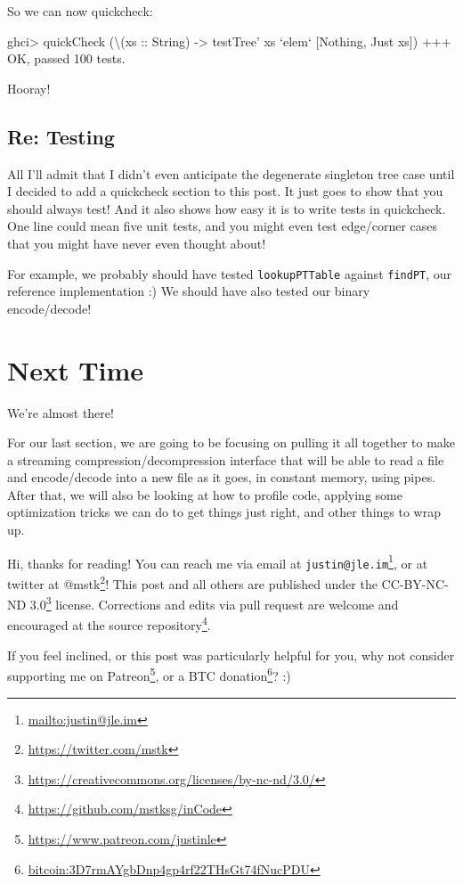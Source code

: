 \documentclass[]{article}
\newenvironment{Shaded}{}{}
\newcommand{\DataTypeTok}[1]{\textcolor[rgb]{0.56,0.13,0.00}{#1}}
\newcommand{\DecValTok}[1]{\textcolor[rgb]{0.25,0.63,0.44}{#1}}
\newcommand{\FunctionTok}[1]{\textcolor[rgb]{0.02,0.16,0.49}{#1}}
\newcommand{\NormalTok}[1]{#1}
\newcommand{\OtherTok}[1]{\textcolor[rgb]{0.00,0.44,0.13}{#1}}
\renewcommand{\href}[2]{#2\footnote{\url{#1}}}
\begin{document}
So we can now quickcheck:

\begin{Shaded}
\begin{Highlighting}[]
\NormalTok{ghci}\FunctionTok{>}\NormalTok{ quickCheck (\textbackslash{}(}\OtherTok{xs ::} \DataTypeTok{String}\NormalTok{) }\OtherTok{->}\NormalTok{ testTree' xs }\OtherTok{`elem`}\NormalTok{ [}\DataTypeTok{Nothing}\NormalTok{, }\DataTypeTok{Just}\NormalTok{ xs])}
\FunctionTok{+++} \DataTypeTok{OK}\NormalTok{, passed }\DecValTok{100}\NormalTok{ tests}\FunctionTok{.}
\end{Highlighting}
\end{Shaded}

Hooray!

\hypertarget{re-testing}{%
\subsection{Re: Testing}\label{re-testing}}

All I'll admit that I didn't even anticipate the degenerate singleton tree case
until I decided to add a quickcheck section to this post. It just goes to show
that you should always test! And it also shows how easy it is to write tests in
quickcheck. One line could mean five unit tests, and you might even test
edge/corner cases that you might have never even thought about!

For example, we probably should have tested \texttt{lookupPTTable} against
\texttt{findPT}, our reference implementation :) We should have also tested our
binary encode/decode!

\hypertarget{next-time}{%
\section{Next Time}\label{next-time}}

We're almost there!

For our last section, we are going to be focusing on pulling it all together to
make a streaming compression/decompression interface that will be able to read a
file and encode/decode into a new file as it goes, in constant memory, using
pipes. After that, we will also be looking at how to profile code, applying some
optimization tricks we can do to get things just right, and other things to wrap
up.

Hi, thanks for reading! You can reach me via email at
\href{mailto:justin@jle.im}{\nolinkurl{justin@jle.im}}, or at twitter at
\href{https://twitter.com/mstk}{@mstk}! This post and all others are published
under the \href{https://creativecommons.org/licenses/by-nc-nd/3.0/}{CC-BY-NC-ND
3.0} license. Corrections and edits via pull request are welcome and encouraged
at \href{https://github.com/mstksg/inCode}{the source repository}.

If you feel inclined, or this post was particularly helpful for you, why not
consider \href{https://www.patreon.com/justinle}{supporting me on Patreon}, or a
\href{bitcoin:3D7rmAYgbDnp4gp4rf22THsGt74fNucPDU}{BTC donation}? :)
\end{document}
